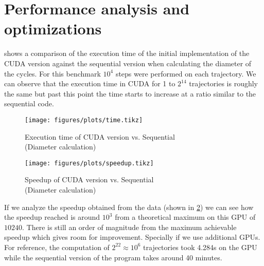 
\section{Performance analysis and optimizations}

 shows a comparison of the execution time of the initial
implementation of the CUDA version against the sequential version when
calculating the diameter of the cycles. For this benchmark $10^4$ steps were
performed on each trajectory.  We can observe that the execution time
in CUDA for 1 to $2^{14}$ trajectories is roughly the same but past this point the
time starts to increase at a ratio similar to the sequential code.


\begin{figure}[H]
    \centering
    \texttt{[image: figures/plots/time.tikz]}
    \caption{Execution time of CUDA version vs. Sequential \\ (Diameter
    calculation)}%
    \label{fig:time_cuda}
\end{figure}

\begin{figure}[H]
    \centering
    \texttt{[image: figures/plots/speedup.tikz]}
    \caption{Speedup of CUDA version vs. Sequential \\ (Diameter
    calculation)}%
    \label{fig:speedup}
\end{figure}

If we analyze the speedup obtained from the data (shown in \cref{fig:speedup})
we can see how the speedup reached is around $10^3$ from a theoretical maximum
on this GPU of $10240$. There is still an order of magnitude from the maximum
achievable speedup which gives room for improvement. Specially if we use
additional GPUs. For reference, the computation of $2^{22} \approx 10^6$ trajectories
took 4.284s on the GPU while the sequential version of the program takes around
40 minutes.
